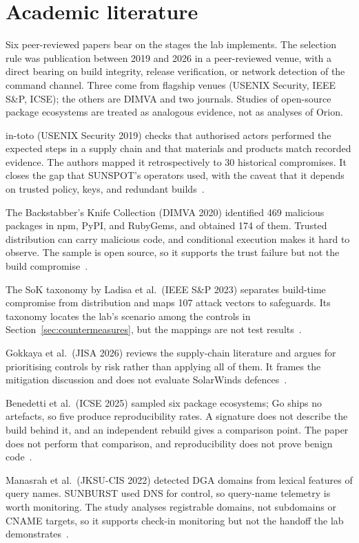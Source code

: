 \section{Academic literature}
\label{sec:literature}

Six peer-reviewed papers bear on the stages the lab implements. The selection rule was publication between 2019 and 2026 in a peer-reviewed venue, with a direct bearing on build integrity, release verification, or network detection of the command channel. Three come from flagship venues (USENIX Security, IEEE S\&P, ICSE); the others are DIMVA and two journals. Studies of open-source package ecosystems are treated as analogous evidence, not as analyses of Orion.

in-toto (USENIX Security 2019) checks that authorised actors performed the expected steps in a supply chain and that materials and products match recorded evidence. The authors mapped it retrospectively to 30 historical compromises. It closes the gap that SUNSPOT's operators used, with the caveat that it depends on trusted policy, keys, and redundant builds~\cite{intoto}.

The Backstabber's Knife Collection (DIMVA 2020) identified 469 malicious packages in npm, PyPI, and RubyGems, and obtained 174 of them. Trusted distribution can carry malicious code, and conditional execution makes it hard to observe. The sample is open source, so it supports the trust failure but not the build compromise~\cite{backstabber}.

The SoK taxonomy by Ladisa et al.\ (IEEE S\&P 2023) separates build-time compromise from distribution and maps 107 attack vectors to safeguards. Its taxonomy locates the lab's scenario among the controls in Section~\ref{sec:countermeasures}, but the mappings are not test results~\cite{sok-taxonomy}.

Gokkaya et al.\ (JISA 2026) reviews the supply-chain literature and argues for prioritising controls by risk rather than applying all of them. It frames the mitigation discussion and does not evaluate SolarWinds defences~\cite{gokkaya}.

Benedetti et al.\ (ICSE 2025) sampled six package ecosystems; Go ships no artefacts, so five produce reproducibility rates. A signature does not describe the build behind it, and an independent rebuild gives a comparison point. The paper does not perform that comparison, and reproducibility does not prove benign code~\cite{reproducible}.

Manasrah et al.\ (JKSU-CIS 2022) detected DGA domains from lexical features of query names. SUNBURST used DNS for control, so query-name telemetry is worth monitoring. The study analyses registrable domains, not subdomains or CNAME targets, so it supports check-in monitoring but not the handoff the lab demonstrates~\cite{dga-detection}.

